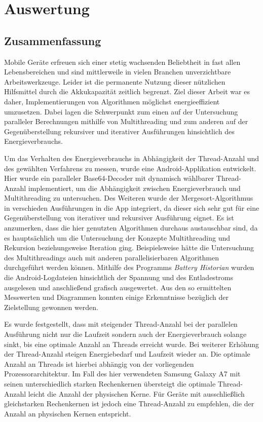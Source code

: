 \chapter{Auswertung}

\section{Zusammenfassung}

Mobile Geräte erfreuen sich einer stetig wachsenden Beliebtheit in fast allen Lebensbereichen und sind mittlerweile in vielen Branchen unverzichtbare Arbeitswerkzeuge. Leider ist die permanente Nutzung dieser nützlichen Hilfsmittel durch die Akkukapazität zeitlich begrenzt. Ziel dieser Arbeit war es daher, Implementierungen von Algorithmen möglichst  energieeffizient umzusetzen. Dabei lagen die Schwerpunkt zum einen auf der Untersuchung paralleler Berechnungen mithilfe von Multithreading und zum anderen auf der Gegenüberstellung rekursiver und iterativer Ausführungen hinsichtlich des Energieverbrauchs.

Um das Verhalten des Energieverbrauchs in Abhängigkeit der Thread-Anzahl und des gewählten Verfahrens zu messen, wurde eine Android-Applikation entwickelt. Hier wurde ein paralleler Base64-Decoder mit dynamisch wählbarer Thread-Anzahl implementiert, um die Abhängigkeit zwischen Energieverbrauch und Multithreading zu untersuchen. Des Weiteren wurde der Mergesort-Algorithmus in verschieden Ausführungen in die App integriert, da dieser sich sehr gut für eine Gegenüberstellung von iterativer und rekursiver Ausführung eignet. Es ist anzumerken, dass die hier genutzten Algorithmen durchaus austauschbar sind, da es hauptsächlich um die Untersuchung der Konzepte Multithreading und Rekursion beziehungsweise Iteration ging. Beispielsweise hätte die Untersuchung des Multithreadings auch mit anderen parallelisierbaren Algorithmen durchgeführt werden können. Mithilfe des Programms \emph{Battery Historian} wurden die Android-Logdateien hinsichtlich der Spannung und des Entladestroms ausgelesen und anschließend grafisch ausgewertet. Aus den so ermittelten Messwerten und Diagrammen konnten einige Erkenntnisse bezüglich der Zielstellung gewonnen werden.

Es wurde festgestellt, dass mit steigender Thread-Anzahl bei der parallelen Ausführung nicht nur die Laufzeit sondern auch der Energieverbrauch solange sinkt, bis eine optimale Anzahl an Threads erreicht wurde. Bei weiterer Erhöhung der Thread-Anzahl steigen Energiebedarf und Laufzeit wieder an. Die optimale Anzahl an Threads ist hierbei abhängig von der vorliegenden Prozessorarchitektur. Im Fall des hier verwendeten Samsung Galaxy A7 mit seinen unterschiedlich starken Rechenkernen übersteigt die optimale Thread-Anzahl leicht die Anzahl der physischen Kerne. Für Geräte mit ausschließlich gleichstarken Rechenkernen ist jedoch eine Thread-Anzahl zu empfehlen, die der Anzahl an physischen Kernen entspricht.

